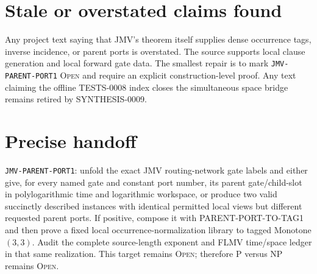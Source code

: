\documentclass[11pt]{article}
\newcommand{\status}[1]{\textsc{#1}}
\begin{document}
\section{Stale or overstated claims found}

Any project text saying that JMV's theorem itself supplies dense occurrence
tags, inverse incidence, or parent ports is overstated.  The source supports
local clause generation and local forward gate data.  The smallest repair is
to mark \texttt{JMV-PARENT-PORT1} \status{Open} and require an explicit
construction-level proof.  Any text claiming the offline TESTS-0008 index
closes the simultaneous space bridge remains retired by SYNTHESIS-0009.

\section*{Precise handoff}

\texttt{JMV-PARENT-PORT1}: unfold the exact JMV routing-network gate labels
and either give, for every named gate and constant port number, its parent
gate/child-slot in polylogarithmic time and logarithmic workspace, or produce
two valid succinctly described instances with identical permitted local
views but different requested parent ports.  If positive, compose it with
PARENT-PORT-TO-TAG1 and then prove a fixed local occurrence-normalization
library to tagged Monotone $(3,3)$.  Audit the complete source-length exponent
and FLMV time/space ledger in that same realization.  This target remains
\status{Open}; therefore P versus NP remains \status{Open}.

\end{document}
